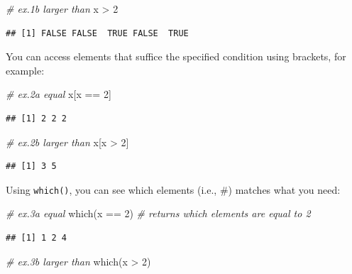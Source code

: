 \documentclass[
]{book}
\newenvironment{Shaded}{\begin{snugshade}}{\end{snugshade}}
\newcommand{\CommentTok}[1]{\textcolor[rgb]{0.56,0.35,0.01}{\textit{#1}}}
\newcommand{\DecValTok}[1]{\textcolor[rgb]{0.00,0.00,0.81}{#1}}
\newcommand{\FunctionTok}[1]{\textcolor[rgb]{0.00,0.00,0.00}{#1}}
\newcommand{\NormalTok}[1]{#1}
\newcommand{\SpecialCharTok}[1]{\textcolor[rgb]{0.00,0.00,0.00}{#1}}
\begin{document}
\begin{Shaded}
\begin{Highlighting}[]
\CommentTok{\# ex.1b larger than}
\NormalTok{x }\SpecialCharTok{\textgreater{}} \DecValTok{2} 
\end{Highlighting}
\end{Shaded}

\begin{verbatim}
## [1] FALSE FALSE  TRUE FALSE  TRUE
\end{verbatim}

You can access elements that suffice the specified condition using brackets, for example:

\begin{Shaded}
\begin{Highlighting}[]
\CommentTok{\# ex.2a equal}
\NormalTok{x[x }\SpecialCharTok{==} \DecValTok{2}\NormalTok{]}
\end{Highlighting}
\end{Shaded}

\begin{verbatim}
## [1] 2 2 2
\end{verbatim}

\begin{Shaded}
\begin{Highlighting}[]
\CommentTok{\# ex.2b larger than}
\NormalTok{x[x }\SpecialCharTok{\textgreater{}} \DecValTok{2}\NormalTok{]}
\end{Highlighting}
\end{Shaded}

\begin{verbatim}
## [1] 3 5
\end{verbatim}

Using \texttt{which()}, you can see which elements (i.e., \#) matches what you need:

\begin{Shaded}
\begin{Highlighting}[]
\CommentTok{\# ex.3a equal}
\FunctionTok{which}\NormalTok{(x }\SpecialCharTok{==} \DecValTok{2}\NormalTok{) }\CommentTok{\# returns which elements are equal to 2}
\end{Highlighting}
\end{Shaded}

\begin{verbatim}
## [1] 1 2 4
\end{verbatim}

\begin{Shaded}
\begin{Highlighting}[]
\CommentTok{\# ex.3b larger than}
\FunctionTok{which}\NormalTok{(x }\SpecialCharTok{\textgreater{}} \DecValTok{2}\NormalTok{)}
\end{Highlighting}
\end{Shaded}
\end{document}
